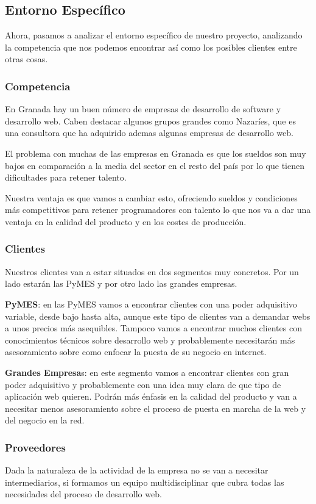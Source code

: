 \subsection{Entorno Específico}
Ahora, pasamos a analizar el entorno específico de nuestro proyecto, analizando la competencia que nos podemos encontrar así como los posibles clientes entre otras cosas.

\subsubsection{Competencia}
En Granada hay un buen número de empresas de desarrollo de software y desarrollo web. Caben destacar algunos grupos grandes como Nazaríes, que es una consultora que ha adquirido ademas algunas empresas de desarrollo web.

El problema con muchas de las empresas en Granada es que los sueldos son muy bajos en comparación a la media del sector en el resto del país por lo que tienen dificultades para retener talento.

Nuestra ventaja es que vamos a cambiar esto, ofreciendo sueldos y condiciones más competitivos para retener programadores con talento lo que nos va a dar una ventaja en la calidad del producto y en los costes de producción.

\subsubsection{Clientes}
Nuestros clientes van a estar situados en dos segmentos muy concretos. Por un lado estarán las PyMES y por otro lado las grandes empresas.

\textbf{PyMES}: en las PyMES vamos a encontrar clientes con una poder adquisitivo variable, desde bajo hasta alta, aunque este tipo de clientes van a demandar webs a unos precios más asequibles. Tampoco vamos a encontrar muchos clientes con conocimientos técnicos sobre desarrollo web y probablemente necesitarán más asesoramiento sobre como enfocar la puesta de su negocio en internet.

\textbf{Grandes Empresa}s: en este segmento vamos a encontrar clientes con gran poder adquisitivo y probablemente con una idea muy clara de que tipo de aplicación web quieren. Podrán más énfasis en la calidad del producto y van a necesitar menos asesoramiento sobre el proceso de puesta en marcha de la web y del negocio en la red.

\subsubsection{Proveedores}
Dada la naturaleza de la actividad de la empresa no se van a necesitar intermediarios, si formamos un equipo multidisciplinar que cubra todas las necesidades del proceso de desarrollo web.

